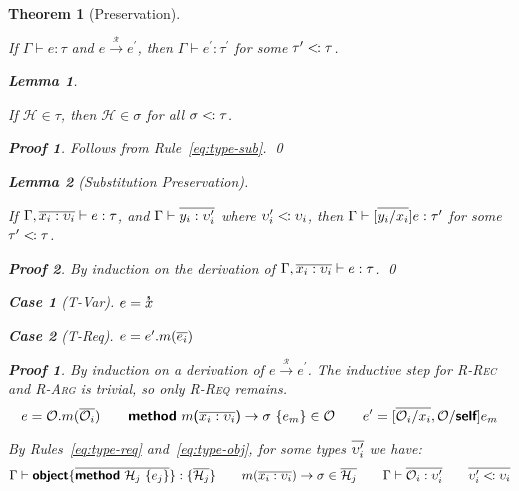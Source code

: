 \documentclass[a4paper, 11pt]{article}
\def\H{\mathcal{H}}
\def\O{\mathcal{O}}
\def\sub{<\kern-1pt:}
\def\bo{{\sffamily\{}}
\def\bc{{\sffamily\}}}
\def\po{{\sffamily(}}
\def\pc{{\sffamily)}}
\newcommand{\object}[1]{\text{{\sffamily\bfseries object}\bo}#1\text{\bc}}
\newcommand{\methh}[2]{\text{{\sffamily\bfseries method} }#1\ \text{\bo}#2\text{\bc}}
\newcommand{\method}[4]{\methh{#1\text{\po}#2\text{\pc }\to #3}{#4}}
\newcommand{\type}[1]{\text{\bo}#1\text{\bc}}
\newcommand{\self}{\text{\sffamily\bfseries self}}
\def\rto{\overset{_\mathcal{R}}\longrightarrow}
\def\xs{\overset{_\text{\sffamily\bfseries s}}x}
\theoremstyle{theorem}
\newtheorem{theorem}{Theorem}
\theoremstyle{lemma}
\newtheorem{lemma}{Lemma}[theorem]
\theoremstyle{tproof}
\newtheorem*{tproof}{Proof}
\theoremstyle{lproof}
\newtheorem*{lproof}{Proof}
\theoremstyle{tcase}
\theoremstyle{lcase}
\newtheorem*{lcase}{Case}
\begin{document}
\begin{theorem}[Preservation]
\label{th:preservation}

If $\Gamma \vdash e : \tau$ and $e \rto e^\prime$, then $\Gamma \vdash e^\prime
: \tau^\prime$ for some $\tau^\prime \sub \tau$.

\begin{lemma}
\label{lem:submethod}

If $\H \in \tau$, then $\H \in \sigma$ for all $\sigma \sub \tau$.

\begin{lproof}
Follows from Rule~\ref{eq:type-sub}. \qed
\end{lproof}

\end{lemma}

\begin{lemma}[Substitution Preservation]
\label{lem:preservation}

If $\Gamma, \*x_i : \upsilon_i* \vdash e : \tau$, and
    $\Gamma \vdash \*y_i : \upsilon^\prime_i*$ where $\upsilon^\prime_i \sub
    \upsilon_i$, then $\Gamma \vdash [\*y_i/x_i*]e : \tau^\prime$ for some
    $\tau^\prime \sub \tau$.

\begin{lproof}

By induction on the derivation of $\Gamma, \*x_i : \upsilon_i* \vdash e : \tau$.
\qed

\begin{lcase}[T-Var]
$e = \xs$
\end{lcase}

\begin{lcase}[T-Req]
$e = e^\prime.m(\*e_i*)$
\end{lcase}

\end{lproof}

\end{lemma}

\begin{tproof}

By induction on a derivation of $e \rto e^\prime$.  The inductive step for
\textsc{R-Rec} and \textsc{R-Arg} is trivial, so only \textsc{R-Req} remains.
\begin{displaymath}
e = \O.m(\*\O_i*) \quad\quad
\method{m}{\*x_i : \upsilon_i*}{\sigma}{e_m} \in \O \quad\quad
e^\prime = [\*\O_i/x_i*, \O/\self]e_m
\end{displaymath}

\noindent By Rules~\ref{eq:type-req} and~\ref{eq:type-obj}, for some types
$\*\upsilon^\prime_i*$ we have:
\begin{displaymath}
\Gamma \vdash \object{\*\methh{\H_j}{e_j}*} : \type{\*\H_j*} \quad\quad
m(\*x_i : \upsilon_i*) \to \sigma \in \*\H_j* \quad\quad
\Gamma \vdash \*\O_i : \upsilon^\prime_i* \quad\quad
\*\upsilon^\prime_i \sub \upsilon_i*
\end{displaymath}


\end{tproof}
\end{theorem}
\end{document}
